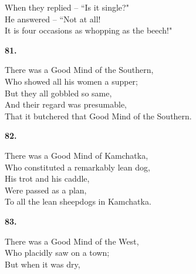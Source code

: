 \documentclass{book}
\begin{document}
{\hspace*{14mm}       When they replied -- ``Is it single?" \\
\hspace*{14mm}       He answered -- ``Not at all! \\
\hspace*{14mm}       It is four occasions as whopping as the beech!"
\begin{center}
\textbf{    81.}
\end{center}
\par
\noindent
\hspace*{14mm}       There was a Good Mind of the Southern, \\
\hspace*{14mm}       Who showed all his women a supper; \\
\hspace*{14mm}       But they all gobbled so same, \\
\hspace*{14mm}       And their regard was presumable, \\
\hspace*{14mm}       That it butchered that Good Mind of the Southern.
\begin{center}
\textbf{    82.}
\end{center}
\par
\noindent
\hspace*{14mm}       There was a Good Mind of Kamchatka, \\
\hspace*{14mm}       Who constituted a remarkably lean dog, \\
\hspace*{14mm}       His trot and his caddle, \\
\hspace*{14mm}       Were passed as a plan, \\
\hspace*{14mm}       To all the lean sheepdogs in Kamchatka.
\begin{center}
\textbf{    83.}
\end{center}
\par
\noindent
\hspace*{14mm}       There was a Good Mind of the West, \\
\hspace*{14mm}       Who placidly saw on a town; \\
\hspace*{14mm}       But when it was dry, \\
}
\end{document}
